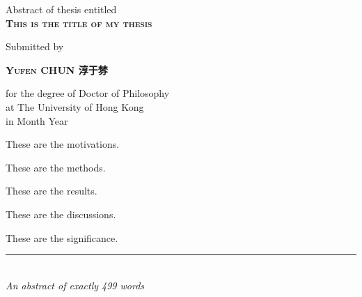 

%
%
\thispagestyle{empty}
\pagestyle{empty} 

\begingroup

\begin{center}
Abstract of thesis entitled\\
\bigskip
\bigskip
{\huge\textsc
	{
	\textbf{This is the title of my thesis}
	}
}\\

\bigskip
\bigskip

Submitted by\\

\bigskip
\bigskip

{\Large\textsc
	{\textbf{Yufen CHUN 淳于棼}
	}\\
}
\bigskip
\bigskip

for the degree of Doctor of Philosophy\\
at The University of Hong Kong\\
in Month Year

\bigskip

\end{center}

{\normalsize

These are the motivations. \lipsum[1]%

These are the methods. \lipsum[1]%

These are the results. \lipsum[1]%

These are the discussions. \lipsum[1]%

These are the significance. \lipsum[1]%

\bigskip
\bigskip

\begin{center}
\rule{8cm}{.5pt}\\
{\slshape An abstract of exactly 499 words}
\end{center}

}

\vfill
\endgroup
